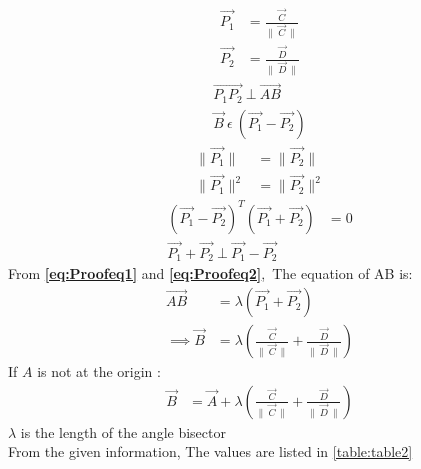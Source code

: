 \begin{enumerate}[label=\thesection.\arabic*.,ref=\thesection.\theenumi]
\begin{align}
\vec{P_1} &= \frac{\vec{C}}{\|\ \vec{C}\ \|} \\
\vec{P_2} &= \frac{\vec{D}}{\|\ \vec{D}\ \|} 
\end{align}
\begin{align}
\vec{P_1P_2} \ \bot \ \vec{AB} \\
\vec{B}\  \epsilon \ (\vec{P_1}-\vec{P_2}) \label{eq:Proofeq1} 
\end{align}
\begin{align}
\| \vec{P_1} \| &= \| \vec{P_2} \| \\
\| \vec{P_1} \|^2 &= \| \vec{P_2} \|^2 
\end{align}
\begin{align}
(\vec{P_1}-\vec{P_2})^T(\vec{P_1}+\vec{P_2}) &= 0 \\
\vec{P_1} + \vec{P_2} \ \bot\  \vec{P_1}-\vec{P_2} \label{eq:Proofeq2}
\end{align}
From \textbf{\ref{eq:Proofeq1}} and \textbf{\ref{eq:Proofeq2}},\ The equation of AB is:
\begin{align}
\vec{AB} &= \lambda(\vec{P_1}+\vec{P_2}) \\
\implies \vec{B} &= \lambda(\frac{\vec{C}}{\|\ \vec{C}\ \|}+\frac{\vec{D}}{\|\ \vec{D}\ \|})
\end{align}
If $A$ is not at the origin :
\begin{align}
\vec{B} &= \vec{A}+\lambda(\frac{\vec{C}}{\|\ \vec{C}\ \|}+\frac{\vec{D}}{\|\ \vec{D}\ \|})
\end{align}
$\lambda$ is the length of the angle bisector\\

\solution From the given information, 
The values are listed in \ref{table:table2}\\
\begin{table}[ht!]
\centering

\caption{$\vec{B}$}
\label{table:table2}	
\end{table}  


\end{enumerate}
